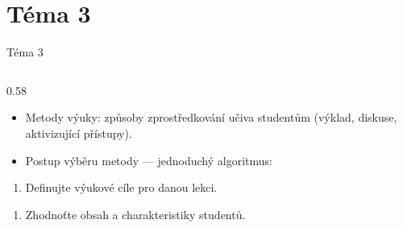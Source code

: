 \documentclass[aspectratio=169]{beamer}
\begin{document}
\section{Téma 3}
\begin{frame}{Téma 3}
\begin{columns}[T,onlytextwidth]
\begin{column}{0.58\textwidth}
\scriptsize
\begin{itemize}

\tightlist

\item

  Metody výuky: způsoby zprostředkování učiva studentům (výklad, diskuse, aktivizující přístupy).

\end{itemize}


\begin{itemize}

\tightlist

\item

  Postup výběru metody --- jednoduchý algoritmus:

\end{itemize}


\begin{enumerate}

\def\labelenumi{\arabic{enumi}.}

\tightlist

\item

  Definujte výukové cíle pro danou lekci.

\end{enumerate}


\begin{enumerate}

\def\labelenumi{\arabic{enumi}.}

\setcounter{enumi}{1}

\tightlist

\item

  Zhodnoťte obsah a charakteristiky studentů.

\end{enumerate}


\begin{enumerate}

\def\labelenumi{\arabic{enumi}.}

\setcounter{enumi}{2}

\tightlist


\end{enumerate}
\end{column}
\end{columns}
\end{frame}
\end{document}
